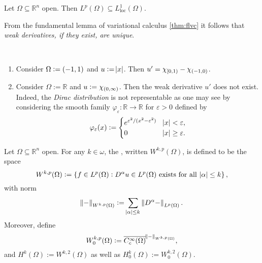 \begin{remark}
	Let $\Omega \subseteq \mathbb{R}^n$ open. Then $L^p(\Omega) \subseteq L^1_{\mathrm{loc}}(\Omega)$.
\end{remark}

\begin{remark}
	From the fundamental lemma of variational calculus \ref{thm:flvc} it follows that \emph{weak derivatives, if they exist, are unique}.
\end{remark}

\begin{examples}
	~
	\begin{enumerate}[label = \textup{(}\alph*\textup{)},wide = 0pt]
		\item Consider $\Omega := \intoo{-1,1}$ and $u := \abs{x}$. Then $u' = \chi_{\intco{0,1}} -\chi_{\intoo{-1,0}}$.
		\item Consider $\Omega := \mathbb{R}$ and $u := \chi_{\intoo{0,\infty}}$. Then the weak derivative $u'$ does not exist. Indeed, the \emph{Dirac distribution} is not representable as one may see by considering the smooth family $\varphi_\varepsilon : \mathbb{R} \to \mathbb{R}$ for $\varepsilon > 0$ defined by
			\begin{equation*}
				\varphi_\varepsilon(x) := \begin{cases}
					e^{\varepsilon^2/(x^2 - \varepsilon^2)} & \abs{x} < \varepsilon,\\
					0 & \abs{x} \geq \varepsilon.
				\end{cases}
			\end{equation*}
	\end{enumerate}
\end{examples}

\begin{definition}
	Let $\Omega \subseteq \mathbb{R}^n$ open. For any $k \in \omega$, the , written $W^{k,p}(\Omega)$, is defined to be the space
	\begin{equation*}
		W^{k,p}(\Omega) := \cbr[0]{f \in L^p(\Omega) : D^\alpha u \in L^p(\Omega) \text{ exists for all } \abs{\alpha} \leq k},
	\end{equation*}
	\noindent with norm
	\begin{equation*}
		\norm{-} _{W^{k,p}(\Omega)} := \sum_{\abs{\alpha} \leq k} \norm[0]{D^\alpha -}_{L^p(\Omega)}.
	\end{equation*}
	Moreover, define
	\begin{equation*}
		W^{k,p}_0(\Omega) := \overline{C^\infty_c(\Omega)}^{\norm{-}_{W^{k,p}(\Omega)}},
	\end{equation*}
	\noindent and $H^k(\Omega) := W^{k,2}(\Omega)$ as well as $H_0^k(\Omega) := W^{k,2}_0(\Omega)$.
\end{definition}

